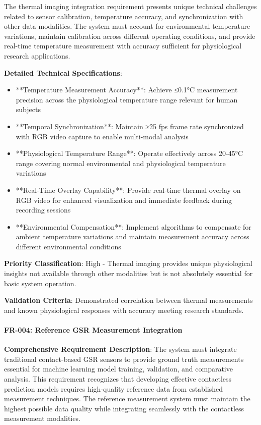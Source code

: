 \documentclass[12pt,a4paper]{report}
\begin{document}
The thermal imaging integration requirement presents unique technical challenges related to sensor calibration,
temperature accuracy, and synchronization with other data modalities. The system must account for environmental
temperature variations, maintain calibration across different operating conditions, and provide real-time temperature
measurement with accuracy sufficient for physiological research applications.

\textbf{Detailed Technical Specifications}:

\begin{itemize}
\item **Temperature Measurement Accuracy**: Achieve ≤0.1°C measurement precision across the physiological temperature range
  relevant for human subjects
\item **Temporal Synchronization**: Maintain ≥25 fps frame rate synchronized with RGB video capture to enable multi-modal
  analysis
\item **Physiological Temperature Range**: Operate effectively across 20-45°C range covering normal environmental and
  physiological temperature variations
\item **Real-Time Overlay Capability**: Provide real-time thermal overlay on RGB video for enhanced visualization and
  immediate feedback during recording sessions
\item **Environmental Compensation**: Implement algorithms to compensate for ambient temperature variations and maintain
  measurement accuracy across different environmental conditions

\end{itemize}
\textbf{Priority Classification}: High - Thermal imaging provides unique physiological insights not available through other
modalities but is not absolutely essential for basic system operation.

\textbf{Validation Criteria}: Demonstrated correlation between thermal measurements and known physiological responses with
accuracy meeting research standards.

\paragraph{FR-004: Reference GSR Measurement Integration}

\textbf{Comprehensive Requirement Description}: The system must integrate traditional contact-based GSR sensors to provide
ground truth measurements essential for machine learning model training, validation, and comparative analysis. This
requirement recognizes that developing effective contactless prediction models requires high-quality reference data from
established measurement techniques. The reference measurement system must maintain the highest possible data quality
while integrating seamlessly with the contactless measurement modalities.
\end{document}
